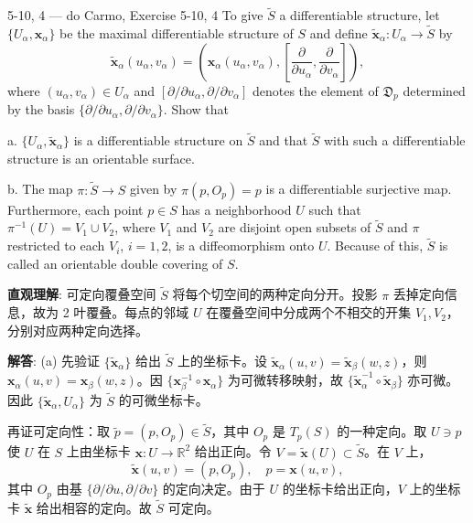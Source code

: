 \begin{Remark}
\begin{exercise}{5-10, 4 — do Carmo, Exercise 5-10, 4}
To give $\tilde{S}$ a differentiable structure, let $\{U_{\alpha},\mathbf{x}_{\alpha}\}$ be the maximal differentiable structure of $S$ and define $\tilde{\mathbf{x}}_{\alpha}\colon U_{\alpha}\to \tilde{S}$ by
\[
\tilde {\mathbf {x}} _ {\alpha} (u _ {\alpha}, v _ {\alpha}) = \left(\mathbf {x} _ {\alpha} (u _ {\alpha}, v _ {\alpha}), \left[ \frac {\partial}{\partial u _ {\alpha}}, \frac {\partial}{\partial v _ {\alpha}} \right]\right),
\]
where $(u_{\alpha},v_{\alpha})\in U_{\alpha}$ and $[\partial /\partial u_{\alpha},\partial /\partial v_{\alpha}]$ denotes the element of $\mathfrak{D}_p$ determined by the basis $\{\partial /\partial u_{\alpha},\partial /\partial v_{\alpha}\}$. Show that

a. $\{U_{\alpha},\tilde{\mathbf{x}}_{\alpha}\}$ is a differentiable structure on $\tilde{S}$ and that $\tilde{S}$ with such a differentiable structure is an orientable surface.

b. The map $\pi \colon \tilde{S} \to S$ given by $\pi(p, O_p) = p$ is a differentiable surjective map. Furthermore, each point $p \in S$ has a neighborhood $U$ such that $\pi^{-1}(U) = V_1 \cup V_2$, where $V_1$ and $V_2$ are disjoint open subsets of $\tilde{S}$ and $\pi$ restricted to each $V_i$, $i = 1, 2$, is a diffeomorphism onto $U$. Because of this, $\tilde{S}$ is called an orientable double covering of $S$.
\end{exercise}
\begin{solution}
\textbf{直观理解}: 可定向覆叠空间 $\tilde{S}$ 将每个切空间的两种定向分开。投影 $\pi$ 丢掉定向信息，故为 2 叶覆叠。每点的邻域 $U$ 在覆叠空间中分成两个不相交的开集 $V_1,V_2$，分别对应两种定向选择。

\textbf{解答}: (a) 先验证 $\{\tilde{\mathbf{x}}_{\alpha}\}$ 给出 $\tilde{S}$ 上的坐标卡。设 $\tilde{\mathbf{x}}_{\alpha}(u,v)=\tilde{\mathbf{x}}_{\beta}(w,z)$，则 $\mathbf{x}_{\alpha}(u,v)=\mathbf{x}_{\beta}(w,z)$。因 $\{\mathbf{x}_{\beta}^{-1}\circ\mathbf{x}_{\alpha}\}$ 为可微转移映射，故 $\{\tilde{\mathbf{x}}_{\alpha}^{-1}\circ\tilde{\mathbf{x}}_{\beta}\}$ 亦可微。因此 $\{\tilde{\mathbf{x}}_{\alpha},U_{\alpha}\}$ 为 $\tilde{S}$ 的可微坐标卡。

再证可定向性：取 $\tilde{p}=(p,O_p)\in\tilde{S}$，其中 $O_p$ 是 $T_p(S)$ 的一种定向。取 $U\ni p$ 使 $U$ 在 $S$ 上由坐标卡 $\mathbf{x}:U\to\mathbb{R}^2$ 给出正向。令 $V=\tilde{\mathbf{x}}(U)\subset\tilde{S}$。在 $V$ 上，
\[
\tilde{\mathbf{x}}(u,v)=(p,O_p),\quad p=\mathbf{x}(u,v),
\]
其中 $O_p$ 由基 $\{\partial/\partial u,\partial/\partial v\}$ 的定向决定。由于 $U$ 的坐标卡给出正向，$V$ 上的坐标卡 $\tilde{\mathbf{x}}$ 给出相容的定向。故 $\tilde{S}$ 可定向。


\end{solution}
\end{Remark}
